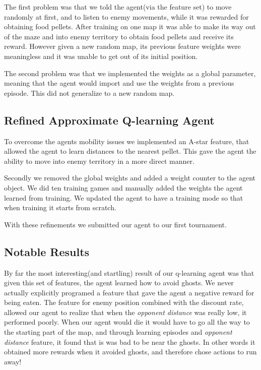 \documentclass[11pt]{article}
\begin{document}
The first problem was that we told the agent(via the feature set) to move randomly at first, and to listen to
enemy movements, while it was rewarded for obtaining food pellets.
After training on one map it was able to make its way out of the maze and into
enemy territory to obtain food pellets and receive its reward. However given a new random map,
its previous feature weights were meaningless and it was unable to get out of its initial position. \

The second problem was that we implemented the weights as a global parameter, meaning that
the agent would import and use the weights from a previous episode. This did not generalize to
a new random map.\

\subsection{Refined Approximate Q-learning Agent}
To overcome the agents mobility issues we implemented an A-star feature, that allowed
the agent to learn distances to the nearest pellet. This gave the agent the ability to
move into enemy territory in a more direct manner. \

Secondly we removed the global weights and added a weight counter to the agent object.
We did ten training games and manually added the weights the agent learned from
training. We updated the agent to have a training mode so that when training
it starts from scratch.\

With these refinements we submitted our agent to our first tournament.\

\subsection{Notable Results}
By far the most interesting(and startling) result of our q-learning agent was that
given this set of features, the agent learned how to avoid ghosts. We never actually
explicitly programed a feature that gave the agent a negative reward for being eaten.
The feature for enemy position combined with the discount rate, allowed our agent to
realize that when the \textit{opponent distance} was really low, it performed poorly.
When our agent would die it would have to go all the way to the starting part of the map, and through
learning episodes and \textit{opponent distance} feature, it found that is was bad to be
near the ghosts. In other words it obtained more rewards when it avoided
ghosts, and therefore chose actions to run away! \
\end{document}
